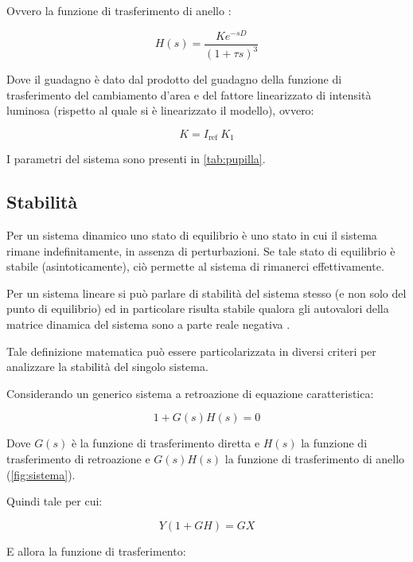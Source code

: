 Ovvero la funzione di trasferimento di anello :

\begin{equation}
	H(s)=\frac{K e^{-s D}}{(1+\tau s)^{3}}
\end{equation}

Dove il guadagno è dato dal prodotto del guadagno della funzione di trasferimento del cambiamento d'area e del fattore linearizzato di intensità luminosa (rispetto al quale si è linearizzato il modello), ovvero:

\begin{equation}
	K=I_{\text {ref }} K_{1}
\end{equation}

I parametri del sistema sono presenti in \cref{tab:pupilla}.



\subsection{Stabilità}

Per un sistema dinamico uno stato di equilibrio è uno stato in cui il sistema rimane indefinitamente, in assenza di perturbazioni. Se tale stato di equilibrio è stabile (asintoticamente), ciò permette al sistema di rimanerci effettivamente. 

Per un sistema lineare si può parlare di stabilità del sistema stesso (e non solo del punto di equilibrio) ed in particolare risulta stabile qualora gli autovalori della matrice dinamica del sistema sono a parte reale negativa \cite{grasselli_sistemi_2008}.

Tale definizione matematica può essere particolarizzata in diversi criteri per analizzare la stabilità del singolo sistema.

Considerando un generico sistema a retroazione di equazione caratteristica:

\begin{equation}
	1+G(s)H(s)=0
			\label{eq:retroazione}
\end{equation}

Dove $G(s)$ è la funzione di trasferimento diretta e $H(s)$ la funzione di trasferimento di retroazione e $G(s)H(s)$ la funzione di trasferimento di anello (\cref{fig:sistema}).

Quindi tale per cui:

\begin{equation}
	Y(1+G H)=G X
\end{equation}

E allora la funzione di trasferimento:


